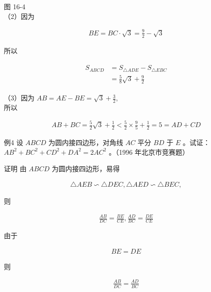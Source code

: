 \documentclass[10pt]{article}
\begin{document}
图 16-4\\
（2）因为

\begin{align*}
B E=B C \cdot \sqrt{3}=\frac{9}{2}-\sqrt{3}
\end{align*}

所以

\begin{align*}
\begin{aligned}
S_{A B C D} & =S_{\triangle A D E}-S_{\triangle E B C} \\
& =\frac{5}{8} \sqrt{3}+\frac{9}{2}
\end{aligned}
\end{align*}

（3）因为 $A B=A E-B E=\sqrt{3}+\frac{3}{2}$,\\
所以

\begin{align*}
A B+B C=\frac{5}{2} \sqrt{3}+\frac{1}{2}<\frac{5}{2} \times \frac{9}{5}+\frac{1}{2}=5=A D+C D
\end{align*}

例4 设 $A B C D$ 为圆内接四边形，对角线 $A C$ 平分 $B D$ 于 $E$ 。试证： $A B^{2}+B C^{2}+C D^{2}+D A^{2}=2 A C^{2}$ 。（1996 年北京市竞赛题）

证明 由 $A B C D$ 为圆内接四边形，易得

\begin{align*}
\triangle A E B \backsim \triangle D E C, \triangle A E D \backsim \triangle B E C,
\end{align*}

则

\begin{align*}
\frac{A B}{D C}=\frac{B E}{C E}, \frac{A D}{B C}=\frac{D E}{C E}
\end{align*}

由于

\begin{align*}
B E=D E
\end{align*}

则

\begin{align*}
\frac{A B}{D C}=\frac{A D}{B C}
\end{align*}
\end{document}
